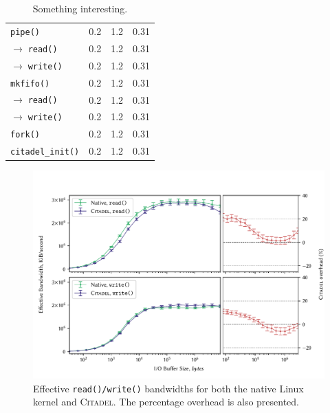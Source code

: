 \begin{table}
\begin{tabular}{l@{\hskip 0.1in} r@{\hskip 0.5in} r@{\hskip 0.25in} r}
        \midrule 
        \texttt{pipe()} & 0.2 & 1.2 & 0.31 \\
        $\longrightarrow\;$\texttt{read()} & 0.2 & 1.2 & 0.31 \\
        $\longrightarrow\;$\texttt{write()} & 0.2 & 1.2 & 0.31 \\

        \midrule 
        \texttt{mkfifo()} & 0.2 & 1.2 & 0.31 \\
        $\longrightarrow\;$\texttt{read()} & 0.2 & 1.2 & 0.31 \\
        $\longrightarrow\;$\texttt{write()} & 0.2 & 1.2 & 0.31 \\

        \midrule 
        \texttt{fork()} & 0.2 & 1.2 & 0.31 \\
        \texttt{citadel\_init()} & 0.2 & 1.2 & 0.31 \\
        \bottomrule
    \end{tabular}

    \caption{Something interesting.}
\end{table}

\begin{figure}[]
    \centering
    \includegraphics[width=\linewidth]{figures/graphs/io.pdf}
    \vspace{-5mm}
    \caption[Effective \texttt{read()/write()} bandwidths for both the native Linux kernel and \textsc{Citadel}.]{Effective \texttt{read()/write()} bandwidths for both the native Linux kernel and \textsc{Citadel}. The percentage overhead is also presented.}
    \label{fig:io-graph}
\end{figure}


